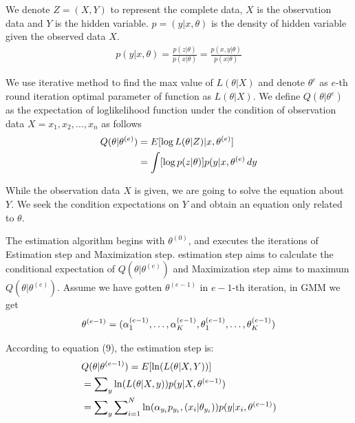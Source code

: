 \documentclass[conference]{IEEEtran}
\begin{document}
We denote $Z = (X,Y)$ to represent the complete data, $X$ is the observation data and $Y$
is the hidden variable. $p = (y|x,\theta)$ is the density of hidden
variable given the observed data $X$. 
  \begin{align}
    p(y|x,\theta) = \frac{p(z|\theta)}{p(x|\theta)} = \frac{p(x,y|\theta)}{p(x|\theta)}
  \end{align}

  We use iterative method to find the max value of $L(\theta|X)$ and denote $\theta^e$ as $e$-th
round iteration optimal parameter of function as $L(\theta|X)$.
We define $Q(\theta|\theta^e)$ as the expectation of loglikelihood 
function under the condition of observation data $X = x_1,x_2,\dots , x_n$ as follows
  \begin{align}
    Q(\theta|\theta^{(e)}) &= E[\log L(\theta|Z)|x,\theta^{(e)}] \notag  \\
& = \int [\log p(z|\theta)]p(y|x,\theta^{(e)} \,dy 
  \end{align}

While the observation data $X$ 
is given, we are going to solve the equation about $Y$. We 
seek the condition expectations on $Y$ and obtain an equation
 only related to $\theta$. 
  
The estimation algorithm begins with $\theta^{(0)}$, and executes
 the iterations of Estimation step and Maximization step.
  estimation step aims to calculate the conditional expectation of 
$Q(\theta|\theta^{(e)})$ and Maximization step aims to maximum $Q(\theta|\theta^{(e)})$.
Assume we have gotten $\theta^{(e-1)}$ in $e-1$-th iteration,
 in GMM we get
 \begin{align}
  \theta^{(e-1)} = (\alpha_1^{(e-1)},\dots , \alpha_K^{(e-1)},\theta_1^{(e-1)},\dots,\theta_K^{(e-1)}) \notag
 \end{align}

  According to equation (9), the estimation step is:
\begin{align}
& Q(\theta|\theta^{(e-1)}) = E[\ln (L(\theta|X,Y))] \notag  \\
& =\sum\nolimits_{y} \ln (L(\theta|X,y)) p(y|X,\theta^{(e-1)}) \notag  \\
& =\sum \nolimits_{y} \sum\nolimits_{i=1}^{N} \ln (\alpha_{y_i} p_{y_i},(x_i|\theta_{y_i})) p(y|x_i,\theta^{(e-1)})
\end{align}
\end{document}

